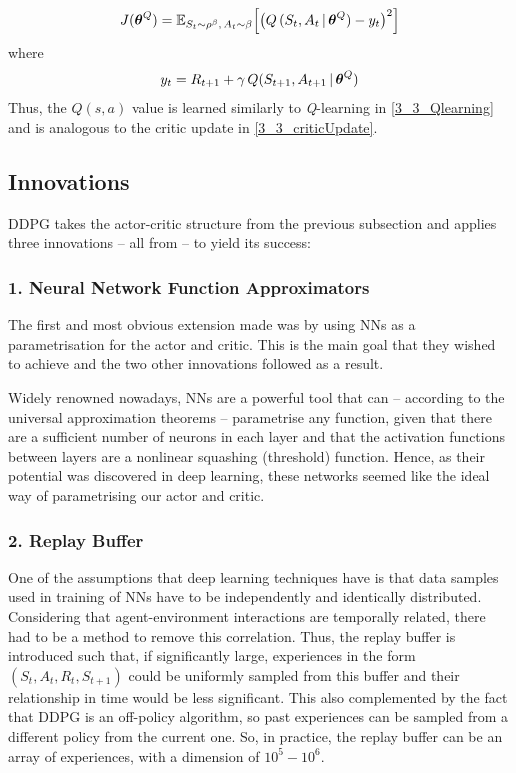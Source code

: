 \begin{equation}
    J(\boldsymbol{\theta}^Q)= \mathbb{E}_{S_t \sim \rho^\beta, \, A_t \sim \beta} \Big[ 
    \big( Q\,(S_t, A_t  \,| \,\boldsymbol{\theta}^Q ) - y_t \big)^2 \label{3_4_criticLoss}
    \Big]
\end{equation}
where
\begin{equation}
    y_t = R_{t+1} + \gamma \,Q(S_{t+1}, A_{t+1} \, | \, \boldsymbol{\theta}^Q) \label{3_4_criticTarget}
\end{equation}
Thus, the $Q(s,a)$ value is learned similarly to \textit{Q}-learning in \eqref{3_3_Qlearning} and is analogous to the critic update in \eqref{3_3_criticUpdate}.

\subsection{Innovations}
\label{subsec:DDPG_Innovations}

DDPG takes the actor-critic structure from the previous subsection and applies three innovations -- all from \cite{DQN} -- to yield its success:

\subsubsection{1. Neural Network Function Approximators}
The first and most obvious extension made was by using NNs as a parametrisation for the actor and critic. This is the main goal that they wished to achieve and the two other innovations followed as a result.

Widely renowned nowadays, NNs are a powerful tool that can -- according to the universal approximation theorems -- parametrise any function, given that there are a sufficient number of neurons in each layer and that the activation functions between layers are a nonlinear squashing (threshold) function.
Hence, as their potential was discovered in deep learning, these networks seemed like the ideal way of parametrising our actor and critic.

\subsubsection{2. Replay Buffer}
One of the assumptions that deep learning techniques have is that data samples used in training of NNs have to be independently and identically distributed. Considering that agent-environment interactions are temporally related, there had to be a method to remove this correlation. Thus, the replay buffer is introduced such that, if significantly large, experiences in the form $(S_t, A_t, R_t, S_{t+1})$ could be uniformly sampled from this buffer and their relationship in time would be less significant. This also complemented by the fact that DDPG is an off-policy algorithm, so past experiences can be sampled from a different policy from the current one. So, in practice, the replay buffer can be an array of experiences, with a dimension of $10^5 - 10^6$.

